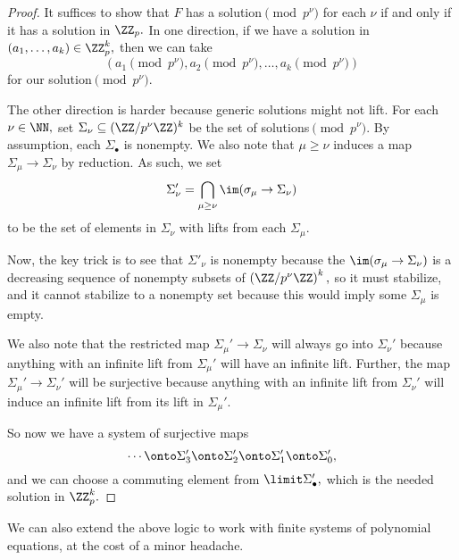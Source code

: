 \documentclass[../notes.tex]{subfiles}
\begin{document}
\begin{proof}
	It suffices to show that $F$ has a solution$\pmod{p^\nu}$ for each $\nu$ if and only if it has a solution in $\ZZ_p.$ In one direction, if we have a solution in $(a_1,\ldots,a_k)\in\ZZ_p^k,$ then we can take
	\[(a_1\pmod{p^\nu},a_2\pmod{p^\nu},\ldots,a_k\pmod{p^\nu})\]
	for our solution$\pmod{p^\nu}.$

	The other direction is harder because generic solutions might not lift. For each $\nu\in\NN,$ set $\Sigma_\nu\subseteq(\ZZ/p^\nu\ZZ)^k$ be the set of solutions$\pmod{p^\nu}.$ By assumption, each $\Sigma_\bullet$ is nonempty. We also note that $\mu\ge\nu$ induces a map $\Sigma_\mu\to\Sigma_\nu$ by reduction. As such, we set
	\[\Sigma'_\nu=\bigcap_{\mu\ge\nu}\im(\sigma_\mu\to\Sigma_\nu)\]
	to be the set of elements in $\Sigma_\nu$ with lifts from each $\Sigma_\mu.$
	
	Now, the key trick is to see that $\Sigma'_\nu$ is nonempty because the $\im(\sigma_\mu\to\Sigma_\nu)$ is a decreasing sequence of nonempty subsets of $\left(\ZZ/p^\nu\ZZ\right)^k,$ so it must stabilize, and it cannot stabilize to a nonempty set because this would imply some $\Sigma_\mu$ is empty.

	We also note that the restricted map $\Sigma_\mu'\to\Sigma_\nu$ will always go into $\Sigma_\nu'$ because anything with an infinite lift from $\Sigma_\mu'$ will have an infinite lift. Further, the map $\Sigma_\mu'\to\Sigma_\nu'$ will be surjective because anything with an infinite lift from $\Sigma_\nu'$ will induce an infinite lift from its lift in $\Sigma_\mu'.$

	So now we have a system of surjective maps
	\[\cdots\onto\Sigma_3'\onto\Sigma_2'\onto\Sigma_1'\onto\Sigma_0',\]
	and we can choose a commuting element from $\limit\Sigma_\bullet',$ which is the needed solution in $\ZZ_p^k.$
\end{proof}
\begin{remark}
	We can also extend the above logic to work with finite systems of polynomial equations, at the cost of a minor headache.
\end{remark}
\end{document}

